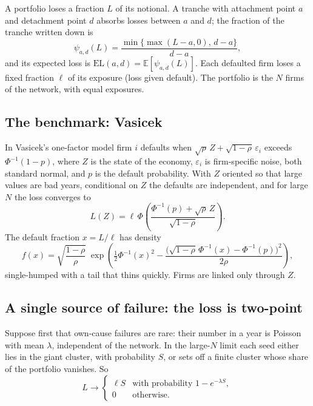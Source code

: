 \documentclass[11pt,a4paper]{article}
\theoremstyle{definition}
\theoremstyle{remark}
\newcommand{\E}{\mathbb{E}}
\begin{document}
A portfolio loses a fraction $L$ of its notional. A tranche with attachment point $a$ and detachment point $d$ absorbs losses between $a$ and $d$; the fraction of the tranche written down is
\begin{equation}
\psi_{a,d}(L) = \frac{\min\{\max(L-a, 0),\, d-a\}}{d-a},
\end{equation}
and its expected loss is $\mathrm{EL}(a,d) = \E[\psi_{a,d}(L)]$. Each defaulted firm loses a fixed fraction $\ell$ of its exposure (loss given default). The portfolio is the $N$ firms of the network, with equal exposures.

\subsection{The benchmark: Vasicek}

In Vasicek's one-factor model \citep{Vasicek2002} firm $i$ defaults when $\sqrt{\rho}\,Z + \sqrt{1-\rho}\,\varepsilon_i$ exceeds $\Phi^{-1}(1-p)$, where $Z$ is the state of the economy, $\varepsilon_i$ is firm-specific noise, both standard normal, and $p$ is the default probability. With $Z$ oriented so that large values are bad years, conditional on $Z$ the defaults are independent, and for large $N$ the loss converges to
\begin{equation}
L(Z) = \ell\, \Phi\!\left(\frac{\Phi^{-1}(p) + \sqrt{\rho}\, Z}{\sqrt{1-\rho}}\right).
\label{eq:vasicek}
\end{equation}
The default fraction $x = L/\ell$ has density
\begin{equation}
f(x) = \sqrt{\frac{1-\rho}{\rho}}\; \exp\!\left( \tfrac12 \Phi^{-1}(x)^2 - \frac{\big(\sqrt{1-\rho}\,\Phi^{-1}(x) - \Phi^{-1}(p)\big)^2}{2\rho} \right),
\end{equation}
single-humped with a tail that thins quickly. Firms are linked only through $Z$.

\subsection{A single source of failure: the loss is two-point}

Suppose first that own-cause failures are rare: their number in a year is Poisson with mean $\lambda$, independent of the network. In the large-$N$ limit each seed either lies in the giant cluster, with probability $S$, or sets off a finite cluster whose share of the portfolio vanishes. So
\begin{equation}
L \to \begin{cases} \ell S & \text{with probability } 1 - e^{-\lambda S}, \\ 0 & \text{otherwise.} \end{cases}
\end{equation}
\end{document}
